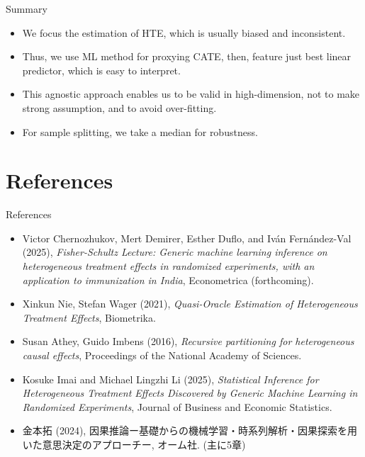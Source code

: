 \documentclass[xcolor=svgnames,aspectratio=169]{beamer}
\begin{document}
\begin{frame}{Summary}
    \begin{itemize}
        \item We focus the estimation of HTE, which is usually biased and inconsistent.
        \item Thus, we use ML method for proxying CATE, then, feature just best linear predictor, which is easy to interpret.
        \item This agnostic approach enables us to be valid in high-dimension, not to make strong assumption, and to avoid over-fitting.
        \item For sample splitting, we take a median for robustness.
    \end{itemize}
\end{frame}

\section{References}

\begin{frame}{References}
    \begin{itemize}
        \item Victor Chernozhukov, Mert Demirer, Esther Duflo, and Iván Fernández-Val (2025), \textit{Fisher-Schultz Lecture: Generic machine learning inference on heterogeneous treatment effects in randomized experiments, with an application to immunization in India}, Econometrica (forthcoming).
        \item Xinkun Nie, Stefan Wager (2021), \textit{Quasi-Oracle Estimation of Heterogeneous Treatment Effects}, Biometrika.
        \item Susan Athey, Guido Imbens (2016), \textit{Recursive partitioning for heterogeneous causal effects}, Proceedings of the National Academy of Sciences. 
        \item Kosuke Imai and Michael Lingzhi Li (2025), \textit{Statistical Inference for Heterogeneous Treatment Effects Discovered by Generic Machine Learning in Randomized Experiments}, Journal of Business and Economic Statistics. 
        \item 金本拓 (2024), 因果推論ー基礎からの機械学習・時系列解析・因果探索を用いた意思決定のアプローチー, オーム社. (主に5章)
    \end{itemize}
\end{frame}
\end{document}
